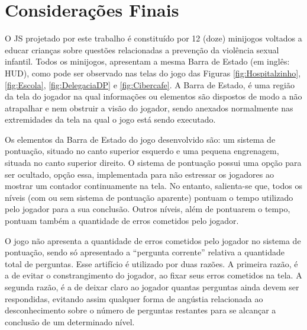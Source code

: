 
\section{Considerações Finais}\label{sec:fim}

O \acf{JS} projetado por este trabalho é constituído por 12 (doze) minijogos voltados a educar crianças sobre questões relacionadas a prevenção da violência sexual infantil. Todos os minijogos, apresentam a mesma Barra de Estado (em inglês: \acl{HUD}), como pode ser observado nas telas do jogo das Figuras \ref{fig:Hospitalzinho}, \ref{fig:Escola}, \ref{fig:DelegaciaDP} e \ref{fig:Cibercafe}. A Barra de Estado, é uma região da tela do jogador na qual informações ou elementos são dispostos de modo a não atrapalhar e nem obstruir a visão do jogador, sendo anexados normalmente nas extremidades da tela na qual o jogo está sendo executado. %

Os elementos da Barra de Estado do jogo desenvolvido são: um sistema de pontuação, situado no canto superior esquerdo e uma pequena engrenagem, situada no canto superior direito. O sistema de pontuação possui uma opção para ser ocultado, opção essa, implementada para não estressar os jogadores ao mostrar um contador continuamente na tela.
No entanto, salienta-se que, todos os níveis (com ou sem sistema de pontuação aparente) pontuam o tempo utilizado pelo jogador para a sua conclusão. Outros níveis, além de pontuarem o tempo, pontuam também a quantidade de erros cometidos pelo jogador. 

O jogo não apresenta a quantidade de erros cometidos pelo jogador no sistema de pontuação, sendo só apresentado a ``pergunta corrente'' relativa a quantidade total de perguntas. Esse artifício é utilizado por duas razões. A primeira razão, é a de evitar o constrangimento do jogador, ao fixar seus erros cometidos na tela. A segunda razão, é a de deixar claro ao jogador quantas perguntas ainda devem ser respondidas, evitando assim qualquer forma de angústia relacionada ao desconhecimento sobre o número de perguntas restantes para se alcançar a conclusão de um determinado nível.

